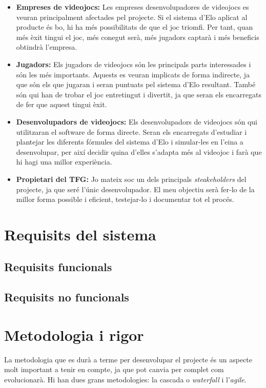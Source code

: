 \documentclass[a4paper]{article}
\begin{document}
\begin{itemize}
    \item \textbf{Empreses de videojocs:} Les empreses desenvolupadores de videojocs es veuran principalment afectades pel projecte. Si el sistema d'Elo aplicat al producte és bo, hi ha més possibilitats de que el joc triomfi. Per tant, quan més èxit tingui el joc, més conegut serà, més jugadors captarà i més beneficis obtindrà l'empresa.
    
    \item \textbf{Jugadors:} Els jugadors de videojocs són les principals parts interessades i són les més importants. Aquests es veuran implicats de forma indirecte, ja que són els que jugaran i seran puntuats pel sistema d'Elo resultant. També són qui han de trobar el joc entretingut i divertit, ja que seran els encarregats de fer que aquest tingui èxit. 
    
    \item \textbf{Desenvolupadors de videojocs:} Els desenvolupadors de videojocs són qui utilitzaran el software de forma directe. Seran els encarregats d'estudiar i plantejar les diferents fórmules del sistema d'Elo i simular-les en l'eina a desenvolupar, per així decidir quina d'elles s'adapta més al videojoc i farà que hi hagi una millor experiència.
    
    \item \textbf{Propietari del TFG:} Jo mateix soc un dels principals \textit{steakeholders} del projecte, ja que seré l'únic desenvolupador. El meu objectiu serà fer-lo de la millor forma possible i eficient, testejar-lo i documentar tot el procés.
    
\end{itemize}

\newpage
\section{Requisits del sistema}
\subsection{Requisits funcionals}
\subsection{Requisits no funcionals}

\newpage
\section{Metodologia i rigor}
La metodologia que es durà a terme per desenvolupar el projecte és un aspecte molt important a tenir en compte, ja que pot canvia per complet com evolucionarà. Hi han dues grans metodologies: la cascada o \textit{waterfall} i l'\textit{agile}.
\end{document}
